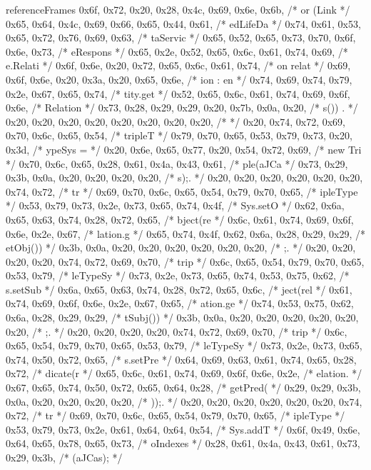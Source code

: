 \begin{chunk}{referenceFrames}
{{{{{{0x6f, 0x72, 0x20, 0x28, 0x4c, 0x69, 0x6e, 0x6b, /* or (Link */
0x65, 0x64, 0x4c, 0x69, 0x66, 0x65, 0x44, 0x61, /* edLifeDa */
0x74, 0x61, 0x53, 0x65, 0x72, 0x76, 0x69, 0x63, /* taServic */
0x65, 0x52, 0x65, 0x73, 0x70, 0x6f, 0x6e, 0x73, /* eRespons */
0x65, 0x2e, 0x52, 0x65, 0x6c, 0x61, 0x74, 0x69, /* e.Relati */
0x6f, 0x6e, 0x20, 0x72, 0x65, 0x6c, 0x61, 0x74, /* on relat */
0x69, 0x6f, 0x6e, 0x20, 0x3a, 0x20, 0x65, 0x6e, /* ion : en */
0x74, 0x69, 0x74, 0x79, 0x2e, 0x67, 0x65, 0x74, /* tity.get */
0x52, 0x65, 0x6c, 0x61, 0x74, 0x69, 0x6f, 0x6e, /* Relation */
0x73, 0x28, 0x29, 0x29, 0x20, 0x7b, 0x0a, 0x20, /* s()) {.  */
0x20, 0x20, 0x20, 0x20, 0x20, 0x20, 0x20, 0x20, /*          */
0x20, 0x74, 0x72, 0x69, 0x70, 0x6c, 0x65, 0x54, /*  tripleT */
0x79, 0x70, 0x65, 0x53, 0x79, 0x73, 0x20, 0x3d, /* ypeSys = */
0x20, 0x6e, 0x65, 0x77, 0x20, 0x54, 0x72, 0x69, /*  new Tri */
0x70, 0x6c, 0x65, 0x28, 0x61, 0x4a, 0x43, 0x61, /* ple(aJCa */
0x73, 0x29, 0x3b, 0x0a, 0x20, 0x20, 0x20, 0x20, /* s);.     */
0x20, 0x20, 0x20, 0x20, 0x20, 0x20, 0x74, 0x72, /*       tr */
0x69, 0x70, 0x6c, 0x65, 0x54, 0x79, 0x70, 0x65, /* ipleType */
0x53, 0x79, 0x73, 0x2e, 0x73, 0x65, 0x74, 0x4f, /* Sys.setO */
0x62, 0x6a, 0x65, 0x63, 0x74, 0x28, 0x72, 0x65, /* bject(re */
0x6c, 0x61, 0x74, 0x69, 0x6f, 0x6e, 0x2e, 0x67, /* lation.g */
0x65, 0x74, 0x4f, 0x62, 0x6a, 0x28, 0x29, 0x29, /* etObj()) */
0x3b, 0x0a, 0x20, 0x20, 0x20, 0x20, 0x20, 0x20, /* ;.       */
0x20, 0x20, 0x20, 0x20, 0x74, 0x72, 0x69, 0x70, /*     trip */
0x6c, 0x65, 0x54, 0x79, 0x70, 0x65, 0x53, 0x79, /* leTypeSy */
0x73, 0x2e, 0x73, 0x65, 0x74, 0x53, 0x75, 0x62, /* s.setSub */
0x6a, 0x65, 0x63, 0x74, 0x28, 0x72, 0x65, 0x6c, /* ject(rel */
0x61, 0x74, 0x69, 0x6f, 0x6e, 0x2e, 0x67, 0x65, /* ation.ge */
0x74, 0x53, 0x75, 0x62, 0x6a, 0x28, 0x29, 0x29, /* tSubj()) */
0x3b, 0x0a, 0x20, 0x20, 0x20, 0x20, 0x20, 0x20, /* ;.       */
0x20, 0x20, 0x20, 0x20, 0x74, 0x72, 0x69, 0x70, /*     trip */
0x6c, 0x65, 0x54, 0x79, 0x70, 0x65, 0x53, 0x79, /* leTypeSy */
0x73, 0x2e, 0x73, 0x65, 0x74, 0x50, 0x72, 0x65, /* s.setPre */
0x64, 0x69, 0x63, 0x61, 0x74, 0x65, 0x28, 0x72, /* dicate(r */
0x65, 0x6c, 0x61, 0x74, 0x69, 0x6f, 0x6e, 0x2e, /* elation. */
0x67, 0x65, 0x74, 0x50, 0x72, 0x65, 0x64, 0x28, /* getPred( */
0x29, 0x29, 0x3b, 0x0a, 0x20, 0x20, 0x20, 0x20, /* ));.     */
0x20, 0x20, 0x20, 0x20, 0x20, 0x20, 0x74, 0x72, /*       tr */
0x69, 0x70, 0x6c, 0x65, 0x54, 0x79, 0x70, 0x65, /* ipleType */
0x53, 0x79, 0x73, 0x2e, 0x61, 0x64, 0x64, 0x54, /* Sys.addT */
0x6f, 0x49, 0x6e, 0x64, 0x65, 0x78, 0x65, 0x73, /* oIndexes */
0x28, 0x61, 0x4a, 0x43, 0x61, 0x73, 0x29, 0x3b, /* (aJCas); */
}}}}}}}
\end{chunk}
